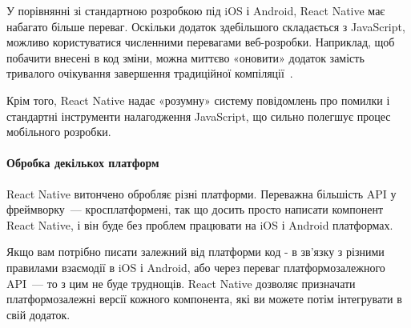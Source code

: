 У порівнянні зі стандартною розробкою під iOS і Android, React Native має набагато більше переваг. Оскільки додаток здебільшого складається з JavaScript, можливо користуватися численними перевагами веб-розробки. Наприклад, щоб побачити внесені в код зміни, можна миттєво «оновити» додаток замість тривалого очікування завершення традиційної компіляції~\cite{robinwieruch2018}. 

Крім того, React Native надає «розумну» систему повідомлень про помилки і стандартні інструменти налагодження JavaScript, що сильно полегшує процес мобільного розробки.

\paragraph{Обробка декількох платформ}

React Native витончено обробляє різні платформи. Переважна більшість API у фреймворку~--- кросплатформені, так що досить просто написати компонент React Native, і він буде без проблем працювати на iOS і Android платформах.

Якщо вам потрібно писати залежний від платформи код - в зв'язку з різними правилами взаємодії в iOS і Android, або через переваг платформозалежного API~--- то з цим не буде труднощів. React Native дозволяє призначати платформозалежні версії кожного компонента, які ви можете потім інтегрувати в свій додаток.

